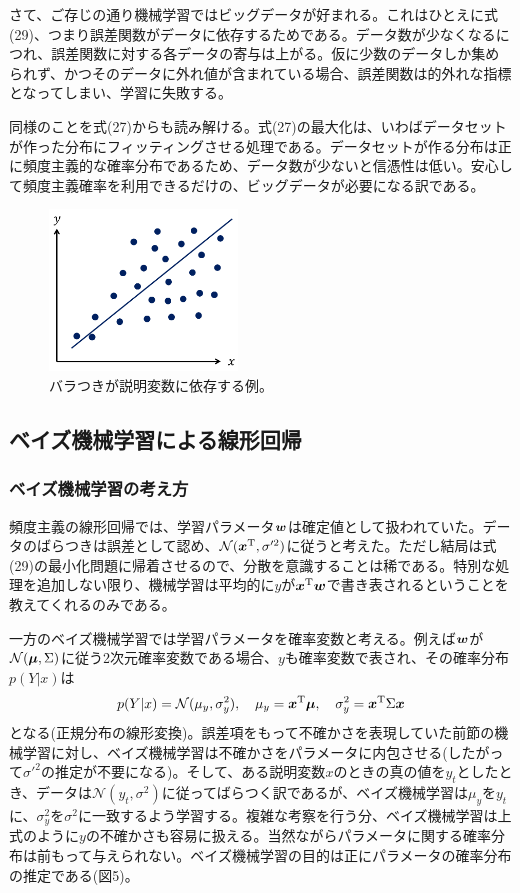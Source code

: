 \documentclass[dvipdfmx, 9pt, a4paper]{jsarticle}
\newcommand{\bm}[1]{{\mbox{\boldmath $#1$}}}
\begin{document}
さて、ご存じの通り機械学習ではビッグデータが好まれる。これはひとえに式(29)、つまり誤差関数がデータに依存するためである。データ数が少なくなるにつれ、誤差関数に対する各データの寄与は上がる。仮に少数のデータしか集められず、かつそのデータに外れ値が含まれている場合、誤差関数は的外れな指標となってしまい、学習に失敗する。\par
同様のことを式(27)からも読み解ける。式(27)の最大化は、いわばデータセットが作った分布にフィッティングさせる処理である。データセットが作る分布は正に頻度主義的な確率分布であるため、データ数が少ないと信憑性は低い。安心して頻度主義確率を利用できるだけの、ビッグデータが必要になる訳である。

\begin{figure}[t]
\begin{center}
\includegraphics[width=5cm]{"fig4.png"}
\caption{バラつきが説明変数に依存する例。}
\end{center}
\end{figure}

\subsection{ベイズ機械学習による線形回帰}
\subsubsection{ベイズ機械学習の考え方}
頻度主義の線形回帰では、学習パラメータ$\bm w$は確定値として扱われていた。データのばらつきは誤差として認め、$\mathcal{N}(\bm x^{\rm T}, \sigma'^2)$に従うと考えた。ただし結局は式(29)の最小化問題に帰着させるので、分散を意識することは稀である。特別な処理を追加しない限り、機械学習は平均的に$y$が$\bm x^{\rm T}\bm w$で書き表されるということを教えてくれるのみである。\par
一方のベイズ機械学習では学習パラメータを確率変数と考える。例えば$\bm w$が$\mathcal{N}(\bm \mu, \Sigma)$に従う2次元確率変数である場合、$y$も確率変数で表され、その確率分布$p(Y|x)$は
\begin{equation}
p(Y|x)=\mathcal{N}(\mu_y, \sigma_y^2),~~~\mu_y=\bm x^{\rm T}\bm \mu,~~~\sigma_y^2=\bm x^{\rm T}\Sigma \bm x \notag
\end{equation}
となる(正規分布の線形変換)。誤差項をもって不確かさを表現していた前節の機械学習に対し、ベイズ機械学習は不確かさをパラメータに内包させる(したがって$\sigma'^2$の推定が不要になる)。そして、ある説明変数$x$のときの真の値を$y_t$としたとき、データは$\mathcal{N}(y_t, \sigma^2)$に従ってばらつく訳であるが、ベイズ機械学習は$\mu_y$を$y_t$に、$\sigma_y^2$を$\sigma^2$に一致するよう学習する。複雑な考察を行う分、ベイズ機械学習は上式のように$y$の不確かさも容易に扱える。当然ながらパラメータに関する確率分布は前もって与えられない。ベイズ機械学習の目的は正にパラメータの確率分布の推定である(図5)。
\end{document}
